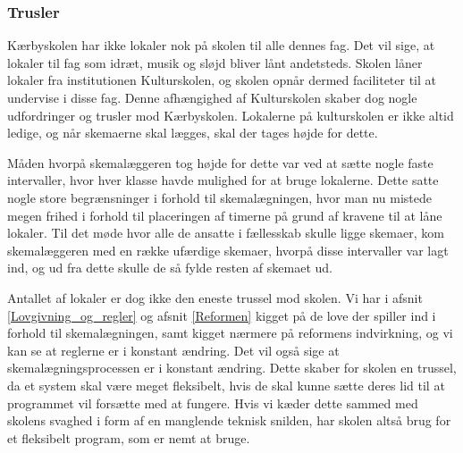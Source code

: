 \subsubsection*{Trusler}
Kærbyskolen har ikke lokaler nok på skolen til alle dennes fag. Det vil sige, at lokaler til fag som idræt, musik og sløjd bliver lånt andetsteds. Skolen låner lokaler fra institutionen Kulturskolen, og skolen opnår dermed faciliteter til at undervise i disse fag. Denne afhængighed af Kulturskolen skaber dog nogle udfordringer og trusler mod Kærbyskolen. Lokalerne på kulturskolen er ikke altid ledige, og når skemaerne skal lægges, skal der tages højde for dette. 

Måden hvorpå skemalæggeren tog højde for dette var ved at sætte nogle faste intervaller, hvor hver klasse havde mulighed for at bruge lokalerne. Dette satte nogle store begrænsninger i forhold til skemalægningen, hvor man nu mistede megen frihed i forhold til placeringen af timerne på grund af kravene til at låne lokaler. Til det møde hvor alle de ansatte i fællesskab skulle ligge skemaer, kom skemalæggeren med en række ufærdige skemaer, hvorpå disse intervaller var lagt ind, og ud fra dette skulle de så fylde resten af skemaet ud.  

Antallet af lokaler er dog ikke den eneste trussel mod skolen. Vi har i afsnit \ref{Lovgivning_og_regler} og afsnit \ref{Reformen} kigget på de love der spiller ind i forhold til skemalægningen, samt kigget nærmere på reformens indvirkning, og vi kan se at reglerne er i konstant ændring. Det vil også sige at skemalægningsprocessen er i konstant ændring. Dette skaber for skolen en trussel, da et system skal være meget fleksibelt, hvis de skal kunne sætte deres lid til at programmet vil forsætte med at fungere. Hvis vi kæder dette sammed med skolens svaghed i form af en manglende teknisk snilden, har skolen altså brug for et fleksibelt program, som er nemt at bruge.
